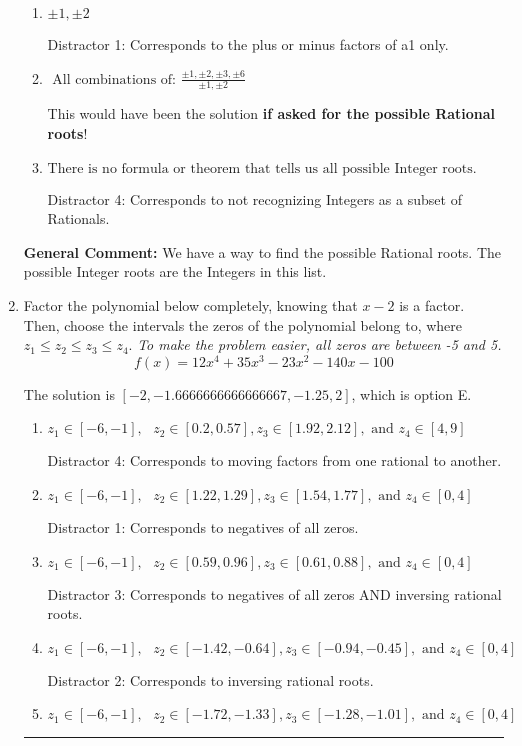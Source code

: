 \documentclass{extbook}[14pt]
\newcommand{\litem}[1]{\item #1

\rule{\textwidth}{0.4pt}}
\begin{document}
\begin{enumerate}
{\begin{enumerate}[label=\Alph*.]
* This is the solution \textbf{since we asked for the possible Integer roots}!
\item \( \pm 1,\pm 2 \)

 Distractor 1: Corresponds to the plus or minus factors of a1 only.
\item \( \text{ All combinations of: }\frac{\pm 1,\pm 2,\pm 3,\pm 6}{\pm 1,\pm 2} \)

This would have been the solution \textbf{if asked for the possible Rational roots}!
\item \( \text{There is no formula or theorem that tells us all possible Integer roots.} \)

 Distractor 4: Corresponds to not recognizing Integers as a subset of Rationals.
\end{enumerate}

\textbf{General Comment:} We have a way to find the possible Rational roots. The possible Integer roots are the Integers in this list.
}
\litem{
Factor the polynomial below completely, knowing that $x-2$ is a factor. Then, choose the intervals the zeros of the polynomial belong to, where $z_1 \leq z_2 \leq z_3 \leq z_4$. \textit{To make the problem easier, all zeros are between -5 and 5.}
\[ f(x) = 12x^{4} +35 x^{3} -23 x^{2} -140 x -100 \]

The solution is \( [-2, -1.6666666666666667, -1.25, 2] \), which is option E.\begin{enumerate}[label=\Alph*.]
\item \( z_1 \in [-6, -1], \text{   }  z_2 \in [0.2, 0.57], z_3 \in [1.92, 2.12], \text{   and   } z_4 \in [4, 9] \)

 Distractor 4: Corresponds to moving factors from one rational to another.
\item \( z_1 \in [-6, -1], \text{   }  z_2 \in [1.22, 1.29], z_3 \in [1.54, 1.77], \text{   and   } z_4 \in [0, 4] \)

 Distractor 1: Corresponds to negatives of all zeros.
\item \( z_1 \in [-6, -1], \text{   }  z_2 \in [0.59, 0.96], z_3 \in [0.61, 0.88], \text{   and   } z_4 \in [0, 4] \)

 Distractor 3: Corresponds to negatives of all zeros AND inversing rational roots.
\item \( z_1 \in [-6, -1], \text{   }  z_2 \in [-1.42, -0.64], z_3 \in [-0.94, -0.45], \text{   and   } z_4 \in [0, 4] \)

 Distractor 2: Corresponds to inversing rational roots.
\item \( z_1 \in [-6, -1], \text{   }  z_2 \in [-1.72, -1.33], z_3 \in [-1.28, -1.01], \text{   and   } z_4 \in [0, 4] \)


\end{enumerate}}
\end{enumerate}
\end{document}
